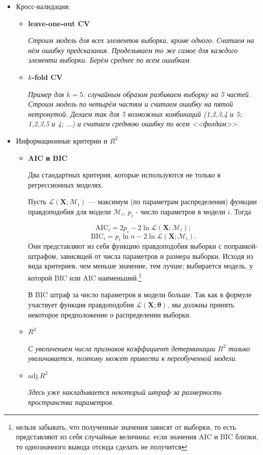 \documentclass[12pt,a4paper,final]{article}
\newcommand{\X}{\bm{X}}
\newcommand{\1}{\mathds{1}}
\begin{document}
\begin{itemize}
	\item Кросс-валидация:
	\begin{itemize}
		\item \textbf{leave-one-out CV }
		
		\textit{Строим модель для всех элементов выборки, кроме одного. Считаем на нём ошибку предсказания. Проделываем то же самое для каждого элемента выборки. Берём среднее по всем ошибкам.}
		\item \textbf{$k$-fold CV}
	
	\textit{Пример для $k = 5$: случайным образом разбиваем выборку на 5 частей. Строим модель по четырём частям и считаем ошибку на пятой нетронутой. Делаем так для 5 возможных комбинаций (1,2,3,4 и 5; 1,2,3,5 и 4; $\ldots$) и считаем среднюю ошибку по всем <<фолдам>>.}
	\end{itemize}
	\item Информационные критерии и $R^2$
		\begin{itemize}
	\item \textbf{AIC и BIC}
	
	Два стандартных критерия, которые используются не только в регрессионных моделях.
	
	Пусть $\mathcal L(\X; \mathcal M_i)$ --- максимум (по параметрам распределения) функции правдоподобия для модели $\mathcal M_i$, $p_i$ - число параметров в модели $i$. Тогда

	$$
	\mathrm{AIC}_i = 2p_i - 2\ln{\mathcal L(\X; \mathcal M_i)};
	$$
	$$
	\mathrm{BIC}_i = p_i\ln{n} - 2\ln{\mathcal L(\X; \mathcal M_i)}.
	$$
 Они представляют из себя функцию правдоподобия выборки с поправкой-штрафом, зависящей от числа параметров и размера выборки. Исходя из вида критериев, чем меньше значение, тем лучше; выбирается модель, у которой BIC или AIC наименьший.\footnote{нельзя забывать, что полученные значения зависят от выборки, то есть представляют из себя случайные величины; если значения AIC и BIC близки, то однозначного вывода отсюда сделать не получится}
 
 В BIC штраф за число параметров в модели больше. Так как в формуле участвует функция правдоподобия $\mathcal L(\X; \bm \theta)$, мы должны принять некоторое предположение о распределении выборки.
	\item \textbf{$R^2$}
	
	\textit{С увеличением числа признаков коэффициент детерминации $R^2$ только увеличивается, поэтому может привести к переобученной модели.
}	\item \textbf{$\text{adj.}R^2$}
	
	\textit{Здесь уже накладывается некоторый штраф за размерность пространства параметров.}
	\end{itemize}
\end{itemize}
\end{document}
